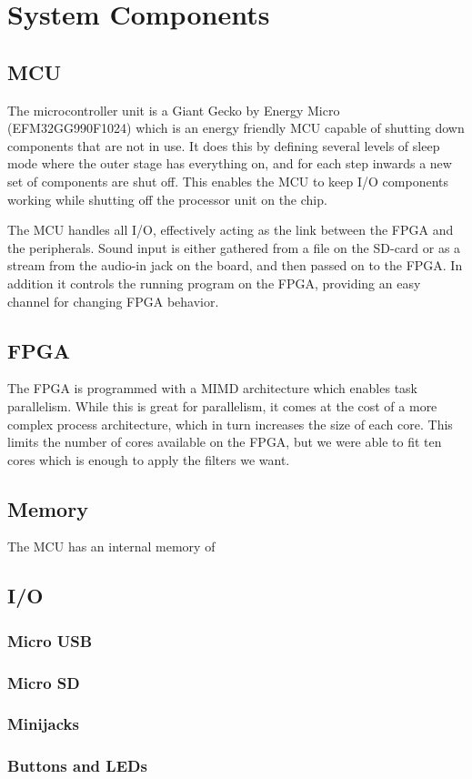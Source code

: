 \section{System Components}
\subsection{MCU}
The microcontroller unit is a Giant Gecko by Energy Micro (EFM32GG990F1024) which is an energy friendly MCU capable of shutting down components that are not in use. It does this by defining several levels of sleep mode where the outer stage has everything on, and for each step inwards a new set of components are shut off. This enables the MCU to keep I/O components working while shutting off the processor unit on the chip.

The MCU handles all I/O, effectively acting as the link between the FPGA and the peripherals. Sound input is either gathered from a file on the SD-card or as a stream from the audio-in jack on the board, and then passed on to the FPGA. In addition it controls the running program on the FPGA, providing an easy channel for changing FPGA behavior.
\subsection{FPGA}
The FPGA is programmed with a MIMD architecture which enables task parallelism. While this is great for parallelism, it comes at the cost of a more complex process architecture, which in turn increases the size of each core. This limits the number of cores available on the FPGA, but we were able to fit ten cores which is enough to apply the filters we want.
\subsection{Memory}
The MCU has an internal memory of 
\subsection{I/O}
\subsubsection{Micro USB}
\subsubsection{Micro SD}
\subsubsection{Minijacks}
\subsubsection{Buttons and LEDs}